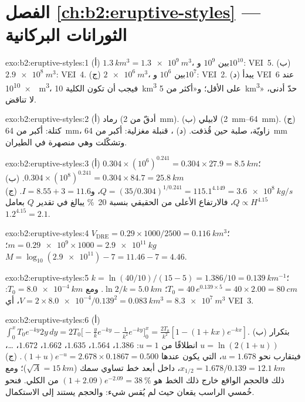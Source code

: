 \section*{الفصل \ref{ch:b2:eruptive-styles} --- الثورانات البركانية}

\begin{solution}{exo:b2:eruptive-styles:1}
(أ) $\qty{1.3}{km^3} = \qty{1.3e9}{m^3}$، بين $10^9$ و$10^{10}$: VEI~5.
(ب) $\qty{2.9e8}{m^3}$: VEI~4. (ج) $\qty{2e6}{m^3}$، بين $10^6$ و$10^7$:
VEI~2. (د) يبدأ VEI~6 عند \qty{e10}{m^3}، فيجب أن تكون  الكلية
\qty{10}{km^3} على الأقل؛ و«أكثر من \qty{5}{km^3}» حدّ أدنى، لا تناقض.
\end{solution}

\begin{solution}{exo:b2:eruptive-styles:2}
(أ) رماد (أدقّ من \qty{2}{mm}). (ب) لابيلي (\qtyrange{2}{64}{mm}).
(ج) كتلة: أكبر من \qty{64}{mm}، زاويّة، صلبة حين قُذفت. (د)
، قنبلة مغزلية: أكبر من \qty{64}{mm} وتشكّلت وهي منصهرة
في الطيران.
\end{solution}

\begin{solution}{exo:b2:eruptive-styles:3}
(أ) $0.304\times(10^6)^{0.241} = 0.304\times27.9 = \qty{8.5}{km}$؛
$0.304\times(10^8)^{0.241} = 0.304\times84.7 = \qty{25.8}{km}$.
(ب) $Q = (35/0.304)^{1/0.241} = 115.1^{4.149} = \qty{3.6e8}{kg/s}$، و$I =
8.55 + 3 = 11.6$. (ج) $Q \propto H^{4.15}$، فالارتفاع الأعلى من الحقيقي بنسبة \qty{20}{\percent}
يبالغ في تقدير $Q$ بعامل $1.2^{4.15} = 2.1$.
\end{solution}

\begin{solution}{exo:b2:eruptive-styles:4}
$V_{\mathrm{DRE}} = 0.29\times1000/2500 = \qty{0.116}{km^3}$؛ $m =
\num{0.29e9}\times1000 = \qty{2.9e11}{kg}$؛ $M = \log_{10}(\num{2.9e11}) - 7 = 11.46
- 7 = 4.46$.
\end{solution}

\begin{solution}{exo:b2:eruptive-styles:5}
$k = \ln(40/10)/(15 - 5) = 1.386/10 = \qty{0.139}{km^{-1}}$؛ $T_0 = 40\,e^{0.139\times5}
= 40\times2.00 = \qty{80}{cm}$؛ $\ln2/k = \qty{5.0}{km}$. ومع $T_0 =
\qty{8.0e-4}{km}$: $V = 2\times\num{8.0e-4}/0.139^2 = \qty{0.083}{km^3} =
\qty{8.3e7}{m^3}$، أي VEI~3.
\end{solution}

\begin{solution}{exo:b2:eruptive-styles:6}
(أ) $\int_0^x T_0e^{-ky}2y\,dy = 2T_0\big[-\tfrac{y}{k}e^{-ky} - \tfrac{1}{k^2}e^{-ky}\big]_0^x
= \tfrac{2T_0}{k^2}[1 - (1 + kx)e^{-kx}]$. (ب) بتكرار $u = \ln(2(1 + u))$ انطلاقًا من
$u = 1$: $1.386$، $1.564$، $1.635$، $1.662$، $1.672$، \dots، فيتقارب نحو
$u = 1.678$، التي يكون عندها $(1 + u)e^{-u} = 2.678\times0.1867 = 0.500$. (ج) $x_{1/2} =
1.678/0.139 = \qty{12.1}{km}$، داخل أبعد خط تساوي سمك ($\sqrt A =
\qty{15}{km}$)؛ ومع ذلك فالحجم الواقع خارج ذلك الخط هو $(1 + 2.09)e^{-2.09} =
\qty{38}{\percent}$ من الكلي. فنحو خُمسي الراسب يقعان حيث
لم يُقس شيء: والحجم يستند إلى الاستكمال.
\end{solution}

